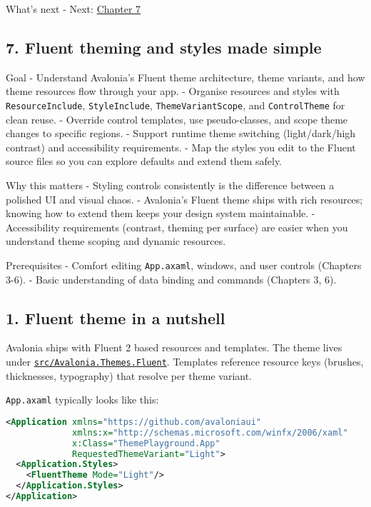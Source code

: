 What's next - Next: \href{Chapter07.md}{Chapter 7}

\newpage

\subsection{7. Fluent theming and styles made
simple}\label{fluent-theming-and-styles-made-simple}

Goal - Understand Avalonia's Fluent theme architecture, theme variants,
and how theme resources flow through your app. - Organise resources and
styles with \passthrough{\lstinline!ResourceInclude!},
\passthrough{\lstinline!StyleInclude!},
\passthrough{\lstinline!ThemeVariantScope!}, and
\passthrough{\lstinline!ControlTheme!} for clean reuse. - Override
control templates, use pseudo-classes, and scope theme changes to
specific regions. - Support runtime theme switching (light/dark/high
contrast) and accessibility requirements. - Map the styles you edit to
the Fluent source files so you can explore defaults and extend them
safely.

Why this matters - Styling controls consistently is the difference
between a polished UI and visual chaos. - Avalonia's Fluent theme ships
with rich resources; knowing how to extend them keeps your design system
maintainable. - Accessibility requirements (contrast, theming per
surface) are easier when you understand theme scoping and dynamic
resources.

Prerequisites - Comfort editing \passthrough{\lstinline!App.axaml!},
windows, and user controls (Chapters 3-6). - Basic understanding of data
binding and commands (Chapters 3, 6).

\subsection{1. Fluent theme in a
nutshell}\label{fluent-theme-in-a-nutshell}

Avalonia ships with Fluent 2 based resources and templates. The theme
lives under
\href{https://github.com/AvaloniaUI/Avalonia/tree/master/src/Avalonia.Themes.Fluent}{\passthrough{\lstinline!src/Avalonia.Themes.Fluent!}}.
Templates reference resource keys (brushes, thicknesses, typography)
that resolve per theme variant.

\passthrough{\lstinline!App.axaml!} typically looks like this:

\begin{lstlisting}[language=XML]
<Application xmlns="https://github.com/avaloniaui"
             xmlns:x="http://schemas.microsoft.com/winfx/2006/xaml"
             x:Class="ThemePlayground.App"
             RequestedThemeVariant="Light">
  <Application.Styles>
    <FluentTheme Mode="Light"/>
  </Application.Styles>
</Application>
\end{lstlisting}

